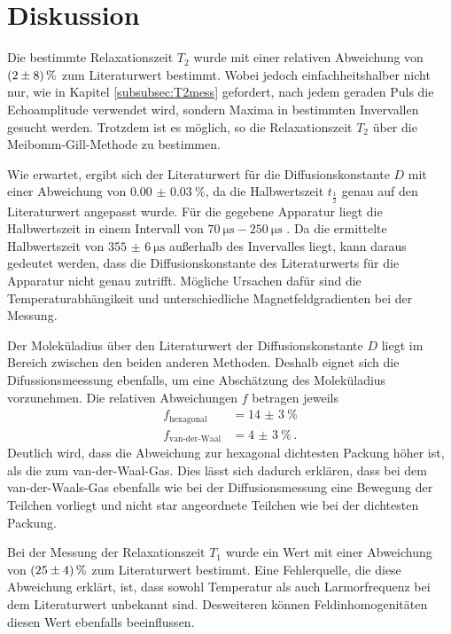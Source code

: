 \newpage
\section{Diskussion}
\label{sec:Diskussion}

Die bestimmte Relaxationszeit $T_{2}$ wurde mit einer
relativen Abweichung von $\SI{2+-8}{\percent}$
zum Literaturwert bestimmt.
Wobei jedoch einfachheitshalber nicht nur, wie in Kapitel \ref{subsubsec:T2mess}
gefordert, nach jedem geraden
Puls die Echoamplitude verwendet wird, sondern Maxima in bestimmten Invervallen gesucht werden.
Trotzdem ist es möglich, so die Relaxationszeit $T_{2}$ über die
Meibomm-Gill-Methode zu bestimmen.

Wie erwartet, ergibt sich der Literaturwert für die Diffusionskonstante $D$
mit einer Abweichung von $\SI{0.00(3)}{\percent}$, da die Halbwertszeit $t_{\frac{1}{2}}$
genau auf den Literaturwert angepasst wurde.
Für die gegebene Apparatur liegt die Halbwertszeit in einem Intervall
von $\SI{70}{\micro\second}-\SI{250}{\micro\second}$ \cite{talk}.
Da die ermittelte Halbwertszeit von $\SI{355(6)}{\micro\second}$
außerhalb des Invervalles liegt, kann daraus gedeutet werden,
dass die Diffusionskonstante des Literaturwerts für die Apparatur nicht genau zutrifft.
Mögliche Ursachen dafür sind die Temperaturabhängikeit und unterschiedliche
Magnetfeldgradienten bei der Messung.

Der Moleküladius über den Literaturwert der Diffusionskonstante $D$
liegt im Bereich zwischen den beiden anderen Methoden. Deshalb eignet sich die
Difussionsmeessung ebenfalls, um eine Abschätzung des Moleküladius vorzunehmen.
Die relativen Abweichungen $f$ betragen jeweils
\begin{align*}
  f_{\text{hexagonal}}&=\SI{14(3)}{\percent}\\
  f_{\text{van-der-Waal}}&=\SI{4(3)}{\percent} \, .
\end{align*}
Deutlich wird, dass die Abweichung zur hexagonal dichtesten Packung
höher ist, als die zum van-der-Waal-Gas.
Dies lässt sich dadurch erklären, dass bei dem van-der-Waals-Gas
ebenfalls
wie bei der Diffusionsmessung eine Bewegung der Teilchen vorliegt
und nicht star angeordnete Teilchen wie bei der dichtesten Packung.



Bei der Messung der Relaxationszeit $T_{1}$ wurde ein Wert mit einer Abweichung von $\SI{25+-4}{\percent}$ zum Literaturwert bestimmt.
Eine Fehlerquelle, die diese Abweichung erklärt,
ist, dass sowohl Temperatur als auch Larmorfrequenz bei dem Literaturwert unbekannt sind.
Desweiteren können Feldinhomogenitäten diesen Wert ebenfalls beeinflussen.
